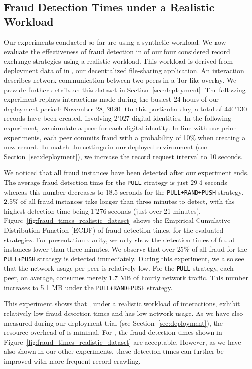 \subsection{Fraud Detection Times under a Realistic Workload}
\label{subsec:realistic_workload}
Our experiments conducted so far are using a synthetic workload.
We now evaluate the effectiveness of fraud detection in \TrustChain{} of our four considered record exchange strategies using a realistic workload.
This workload is derived from deployment data of \TrustChain{} in \Tribler{}, our decentralized file-sharing application.
An interaction describes network communication between two peers in a Tor-like overlay.
We provide further details on this dataset in Section~\ref{sec:deployment}.
The following experiment replays interactions made during the busiest 24 hours of our deployment period: November 28, 2020.
On this particular day, a total of 440'130 records have been created, involving 2'027 digital identities.
In the following experiment, we simulate a peer for each digital identity.
In line with our prior experiments, each peer commits fraud with a probability of 10\% when creating a new record.
To match the \TrustChain{} settings in our deployed environment (see Section~\ref{sec:deployment}), we increase the record request interval to 10 seconds.

We noticed that all fraud instances have been detected after our experiment ends.
The average fraud detection time for the \texttt{PULL} strategy is just 29.4 seconds whereas this number decreases to 18.5 seconds for the \texttt{PULL+RAND+PUSH} strategy.
2.5\% of all fraud instances take longer than three minutes to detect, with the highest detection time being 1'276 seconds (just over 21 minutes).
Figure~\ref{fig:fraud_times_realistic_dataset} shows the Empirical Cumulative Distribution Function (ECDF) of fraud detection times, for the evaluated strategies.
For presentation clarity, we only show the detection times of fraud instances lower than three minutes.
We observe that over 25\% of all fraud for the \texttt{PULL+PUSH} strategy is detected immediately.
During this experiment, we also see that the network usage per peer is relatively low.
For the \texttt{PULL} strategy, each peer, on average, consumes merely 1.7 MB of hourly network traffic.
This number increases to 5.1 MB under the \texttt{PULL+RAND+PUSH} strategy.

This experiment shows that \TrustChain{}, under a realistic workload of \Tribler{} interactions, exhibit relatively low fraud detection times and has low network usage.
As we have also measured during our deployment trial (see Section~\ref{sec:deployment}), the resource overhead of \TrustChain{} is minimal.
For \Tribler{}, the fraud detection times shown in Figure~\ref{fig:fraud_times_realistic_dataset} are acceptable.
However, as we have also shown in our other experiments, these detection times can further be improved with more frequent record crawling.

